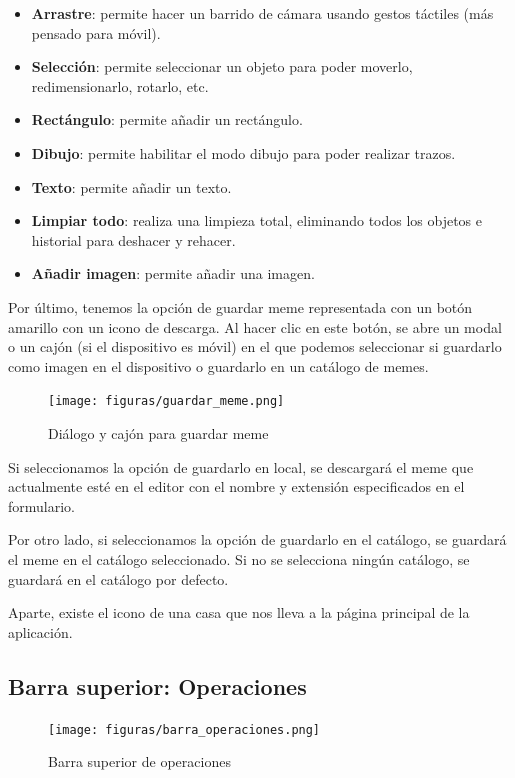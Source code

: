 \begin{itemize}
    \item \textbf{Arrastre}: permite hacer un barrido de cámara usando gestos táctiles (más pensado para móvil).
    \item \textbf{Selección}: permite seleccionar un objeto para poder moverlo, redimensionarlo, rotarlo, etc.
    \item \textbf{Rectángulo}: permite añadir un rectángulo.
    \item \textbf{Dibujo}: permite habilitar el modo dibujo para poder realizar trazos.
    \item \textbf{Texto}: permite añadir un texto.
    \item \textbf{Limpiar todo}: realiza una limpieza total, eliminando todos los objetos e historial para deshacer y rehacer.
    \item \textbf{Añadir imagen}: permite añadir una imagen.
\end{itemize}

Por último, tenemos la opción de guardar meme representada con un botón amarillo con un icono de descarga. Al hacer clic en este botón, se abre un modal o un cajón (si el dispositivo es móvil) en el que podemos seleccionar si guardarlo como imagen en el dispositivo o guardarlo en un catálogo de memes.

\begin{figure}[H]
    \caption{Diálogo y cajón para guardar meme}
    \centering
    \vspace*{0.5cm}
    \texttt{[image: figuras/guardar\_meme.png]}
\end{figure}

Si seleccionamos la opción de guardarlo en local, se descargará el meme que actualmente esté en el editor con el nombre y extensión especificados en el formulario.

Por otro lado, si seleccionamos la opción de guardarlo en el catálogo, se guardará el meme en el catálogo seleccionado. Si no se selecciona ningún catálogo, se guardará en el catálogo por defecto.

Aparte, existe el icono de una casa que nos lleva a la página principal de la aplicación.

\subsection{Barra superior: Operaciones}

\begin{figure}[H]
    \caption{Barra superior de operaciones}
    \centering
    \vspace*{0.5cm}
    \texttt{[image: figuras/barra\_operaciones.png]}
\end{figure}

